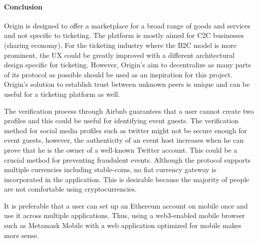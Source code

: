\paragraph{Conclusion}
Origin is designed to offer a marketplace for a broad range of goods and services and not specific to ticketing. The platform is mostly aimed for C2C businesses (sharing economy). For the ticketing industry where the B2C model is more prominent, the UX could be greatly improved with a different architectural design specific for ticketing.
However, Origin's aim to decentralize as many parts of its protocol as possible should be used as an inspiration for this project. Origin's solution to establish trust between unknown peers is unique and can be useful for a ticketing platform as well. 

The verification process through Airbnb guarantees that a user cannot create two profiles and this could be useful for identifying event guests. The verification method for social media profiles such as twitter might not be secure enough for event guests, however, the authenticity of an event host increases when he can prove that he is the owner of a well-known Twitter account. 
This could be a crucial method for preventing fraudulent events.
Although the protocol supports multiple currencies including stable-coins, no fiat currency gateway is incorporated in the application. This is desirable because the majority of people are not comfortable using cryptocurrencies.

It is preferable that a user can set up an Ethereum account on mobile once and use it across multiple applications. Thus, using a web3-enabled mobile browser such as Metamask Mobile with a web application optimized for mobile makes more sense.


